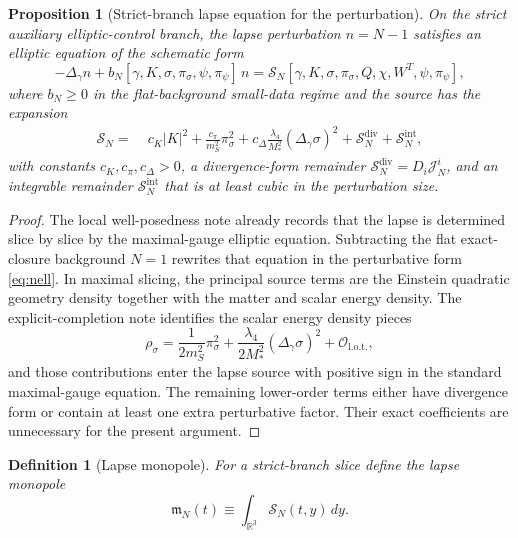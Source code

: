 \documentclass[11pt]{article}
\newtheorem{definition}{Definition}
\newtheorem{proposition}{Proposition}
\begin{document}
\begin{proposition}[Strict-branch lapse equation for the perturbation]
On the strict auxiliary elliptic-control branch, the lapse perturbation \(n=N-1\) satisfies an elliptic equation of the schematic form
\begin{equation}
-\Delta_\gamma n + b_N[\gamma,K,\sigma,\pi_\sigma,\psi,\pi_\psi]\,n
=
\mathcal S_N[\gamma,K,\sigma,\pi_\sigma,Q,\chi,W^T,\psi,\pi_\psi],
\label{eq:nell}
\end{equation}
where \(b_N\ge 0\) in the flat-background small-data regime and the source has the expansion
\begin{align}
\mathcal S_N
=\;&
c_K |K|^2
+ \frac{c_\pi}{m_S^2}\pi_\sigma^2
+ c_\Delta\frac{\lambda_4}{M_\ast^2}(\Delta_\gamma\sigma)^2
+ \mathcal S_N^{\mathrm{div}}
+ \mathcal S_N^{\mathrm{int}},
\label{eq:SN}
\end{align}
with constants \(c_K,c_\pi,c_\Delta>0\), a divergence-form remainder \(\mathcal S_N^{\mathrm{div}}=D_i\mathcal J_N^i\), and an integrable remainder \(\mathcal S_N^{\mathrm{int}}\) that is at least cubic in the perturbation size.
\end{proposition}

\begin{proof}
The local well-posedness note already records that the lapse is determined slice by slice by the maximal-gauge elliptic equation. Subtracting the flat exact-closure background \(N=1\) rewrites that equation in the perturbative form \eqref{eq:nell}. In maximal slicing, the principal source terms are the Einstein quadratic geometry density together with the matter and scalar energy density. The explicit-completion note identifies the scalar energy density pieces
\[
\rho_\sigma
=
\frac{1}{2m_S^2}\pi_\sigma^2
+ \frac{\lambda_4}{2M_\ast^2}(\Delta_\gamma\sigma)^2
+ \mathcal O_{\mathrm{l.o.t.}},
\]
and those contributions enter the lapse source with positive sign in the standard maximal-gauge equation. The remaining lower-order terms either have divergence form or contain at least one extra perturbative factor. Their exact coefficients are unnecessary for the present argument.
\end{proof}

\begin{definition}[Lapse monopole]
For a strict-branch slice define the \emph{lapse monopole}
\begin{equation}
\mathfrak m_N(t)
\equiv
\int_{\mathbb R^3}\mathcal S_N(t,y)\,dy.
\label{eq:mN}
\end{equation}
\end{definition}
\end{document}

